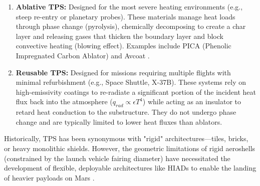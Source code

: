 \begin{enumerate}
    \item \textbf{Ablative TPS:} Designed for the most severe heating environments (e.g., steep re-entry or planetary probes). These materials manage heat loads through phase change (pyrolysis), chemically decomposing to create a char layer and releasing gases that thicken the boundary layer and block convective heating (blowing effect). Examples include PICA (Phenolic Impregnated Carbon Ablator) and Avcoat \cite{TPS-stateofIndustryNASA}.
    
    \item \textbf{Reusable TPS:} Designed for missions requiring multiple flights with minimal refurbishment (e.g., Space Shuttle, X-37B). These systems rely on high-emissivity coatings to re-radiate a significant portion of the incident heat flux back into the atmosphere ($q_{rad} \propto \epsilon T^4$) while acting as an insulator to retard heat conduction to the substructure. They do not undergo phase change and are typically limited to lower heat fluxes than ablators.
\end{enumerate}

Historically, TPS has been synonymous with "rigid" architectures—tiles, bricks, or heavy monolithic shields. However, the geometric limitations of rigid aeroshells (constrained by the launch vehicle fairing diameter) have necessitated the development of flexible, deployable architectures like HIADs to enable the landing of heavier payloads on Mars \cite{DiNonnoLOFTID}.

